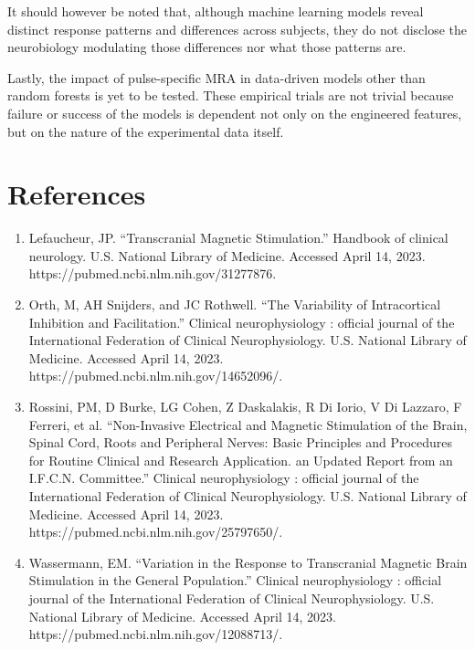 \documentclass{article}
\begin{document}
\begin{multicols}{2}
It should however be noted that, although machine learning models reveal
distinct response patterns and differences across subjects, they do not disclose
the neurobiology modulating those differences nor what those patterns are. 

Lastly, the impact of pulse-specific MRA in data-driven models other than random forests
is yet to be tested. These empirical trials are not trivial because failure or
success of the models is dependent not only on the engineered features, but on
the nature of the experimental data itself. 

\end{multicols}

\section{References}

\begin{enumerate}
    \item Lefaucheur, JP. “Transcranial Magnetic Stimulation.” Handbook of clinical neurology. U.S. National Library of Medicine. Accessed April 14, 2023. https://pubmed.ncbi.nlm.nih.gov/31277876. 
    \item Orth, M, AH Snijders, and JC Rothwell. “The Variability of Intracortical Inhibition and Facilitation.” Clinical neurophysiology : official journal of the International Federation of Clinical Neurophysiology. U.S. National Library of Medicine. Accessed April 14, 2023. https://pubmed.ncbi.nlm.nih.gov/14652096/. 
    \item Rossini, PM, D Burke, LG Cohen, Z Daskalakis, R Di Iorio, V Di Lazzaro, F Ferreri, et al. “Non-Invasive Electrical and Magnetic Stimulation of the Brain, Spinal Cord, Roots and Peripheral Nerves: Basic Principles and Procedures for Routine Clinical and Research Application. an Updated Report from an I.F.C.N. Committee.” Clinical neurophysiology : official journal of the International Federation of Clinical Neurophysiology. U.S. National Library of Medicine. Accessed April 14, 2023. https://pubmed.ncbi.nlm.nih.gov/25797650/. 
        \item Wassermann, EM. “Variation in the Response to Transcranial
            Magnetic Brain Stimulation in the General Population.” Clinical
            neurophysiology : official journal of the International Federation
            of Clinical Neurophysiology. U.S. National Library of Medicine.
            Accessed April 14, 2023. \newline https://pubmed.ncbi.nlm.nih.gov/12088713/. 
\end{enumerate}
\end{document}
